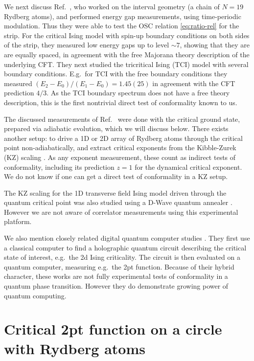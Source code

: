 \documentclass[a4paper,11pt]{article}
\theoremstyle{remark}
\theoremstyle{theorem}
\begin{document}
We next discuss Ref.~{\cite{Sun:2026aqf}}, who worked on the interval geometry
(a chain of $N = 19$ Rydberg atoms), and performed energy gap measurements,
using time-periodic modulation. Thus they were able to test the OSC relation
\eqref{eq:ratio-rel} for the strip. For the critical Ising model with spin-up
boundary conditions on both sides of the strip, they measured low energy gaps
up to level $\sim 7$, showing that they are are equally spaced, in agreement
with the free Majorana theory description of the underlying CFT. They next
studied the tricritical Ising (TCI) model with several boundary conditions.
E.g.~for TCI with the free boundary conditions they measured $(E_2 - E_0) /
(E_1 - E_0) = 1.45 (25)$ in agreement with the CFT prediction $4 / 3$. As the
TCI boundary spectrum does not have a free theory description, this is the
first nontrivial direct test of conformality known to us.

The discussed measurements of
Ref.~{\cite{Fang:2024uyf,Emperauger:2025raf,Sun:2026aqf}} were done with the
critical ground state, prepared via adiabatic evolution, which we will discuss
below. There exists another setup: to drive a 1D
{\cite{Keesling:2018ish,Zhang:2025xkp}} or 2D
{\cite{Ebadi:2020ldi,Manovitz:2024hif}} array of Rydberg atoms through the
critical point non-adiabatically, and extract critical exponents from the
Kibble-Zurek (KZ) scaling {\cite{delCampo:2013nla}}. As any exponent
measurement, these count as indirect tests of conformality, including its
prediction $z = 1$ for the dynamical critical exponent. We do not know if one
can get a direct test of conformality in a KZ setup.

The KZ scaling for the 1D transverse field Ising model driven through the
quantum critical point was also studied using a D-Wave quantum annealer
{\cite{King:2022phl}}. However we are not aware of correlator measurements
using this experimental platform.

We also mention closely related digital quantum computer studies
{\cite{Anand:2022cdi,Dborin:2022zdd,Haghshenas:2023bje}}. They first use a
classical computer to find a holographic quantum circuit describing the
critical state of interest, e.g.~the 2d Ising criticality. The circuit is then
evaluated on a quantum computer, measuring e.g.~the 2pt function. Because of
their hybrid character, these works are not fully experimental tests of
conformality in a quantum phase transition. However they do demonstrate
growing power of quantum computing.

\section{Critical 2pt function on a circle with Rydberg atoms}\label{sec:prop}
\end{document}

